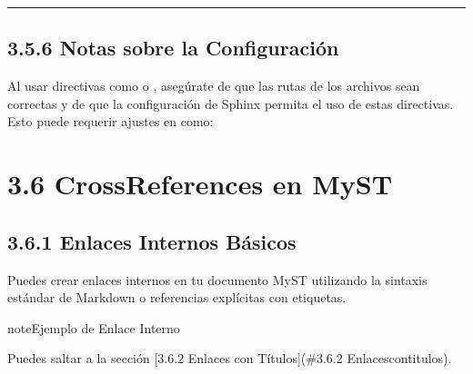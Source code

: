 \documentclass[a4paper,10pt,spanish]{sphinxmanual}
\begin{document}
\bigskip\hrule\bigskip



\subsection{3.5.6 Notas sobre la Configuración}
\label{\detokenize{3_guia_myst/code_api:notas-sobre-la-configuracion}}
\sphinxAtStartPar
Al usar directivas como  o , asegúrate de que las rutas de los archivos sean correctas y de que la configuración de Sphinx permita el uso de estas directivas. Esto puede requerir ajustes en  como:

\begin{sphinxVerbatim}[commandchars=\\\{\}]
  \PYG{p}{[}
\PYG{p}{]}
\end{sphinxVerbatim}

\sphinxstepscope


\section{3.6 Cross\sphinxhyphen{}References en MyST}
\label{\detokenize{3_guia_myst/cross_references:cross-references-en-myst}}\label{\detokenize{3_guia_myst/cross_references::doc}}

\subsection{3.6.1 Enlaces Internos Básicos}
\label{\detokenize{3_guia_myst/cross_references:enlaces-internos-basicos}}
\sphinxAtStartPar
Puedes crear enlaces internos en tu documento MyST utilizando la sintaxis estándar de Markdown o referencias explícitas con etiquetas.

\begin{sphinxadmonition}{note}{Ejemplo de Enlace Interno}

\sphinxAtStartPar
Puedes saltar a la sección {[}3.6.2 Enlaces con Títulos{]}(\#3.6.2 Enlaces\sphinxhyphen{}con\sphinxhyphen{}titulos).
\end{sphinxadmonition}
\end{document}
